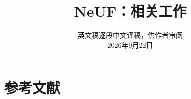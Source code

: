 \documentclass[11pt,a4paper]{article}
\title{NeUF：相关工作}
\author{}
\date{英文稿逐段中文译稿，供作者审阅\\2026年9月22日}
\begin{document}
\maketitle


\section*{参考文献}
\begingroup
{}
\renewcommand{\bibsection}{}

\endgroup
\end{document}
